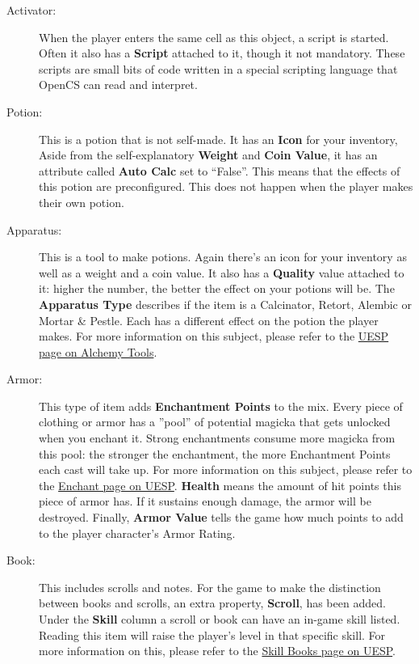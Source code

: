 \begin{description}
 \item[Activator:] When the player enters the same cell as this object, a script is started. Often it also has a \textbf{Script} attached to it, though it not mandatory. These scripts are small bits of code written in a special scripting language that OpenCS can read and interpret.
 \item[Potion:] This is a potion that is not self-made. It has an \textbf{Icon} for your inventory, Aside from the self-explanatory \textbf{Weight} and \textbf{Coin Value}, it has an attribute called \textbf{Auto Calc} set to ``False''. This means that the effects of this potion are preconfigured. This does not happen when the player makes their own potion.
 \item[Apparatus:] This is a tool to make potions. Again there's an icon for your inventory as well as a weight and a coin value. It also has a \textbf{Quality} value attached to it: higher the number, the better the effect on your potions will be. The \textbf{Apparatus Type} describes if the item is a Calcinator, Retort, Alembic or Mortar \& Pestle. Each has a different effect on the potion the player makes. For more information on this subject, please refer to the \href{http://www.uesp.net/wiki/Morrowind:Alchemy#Tools}{UESP page on Alchemy Tools}.
 \item[Armor:] This type of item adds \textbf{Enchantment Points} to the mix. Every piece of clothing or armor has a ''pool'' of potential magicka that gets unlocked when you enchant it. Strong enchantments consume more magicka from this pool: the stronger the enchantment, the more Enchantment Points each cast will take up. For more information on this subject, please refer to the \href{http://www.uesp.net/wiki/Morrowind:Enchant}{Enchant page on UESP}. \textbf{Health} means the amount of hit points this piece of armor has. If it sustains enough damage, the armor will be destroyed. Finally, \textbf{Armor Value} tells the game how much points to add to the player character's Armor Rating.
 \item[Book:] This includes scrolls and notes. For the game to make the distinction between books and scrolls, an extra property, \textbf{Scroll}, has been added. Under the \textbf{Skill} column a scroll or book can have an in-game skill listed. Reading this item will raise the player's level in that specific skill. For more information on this, please refer to the \href{http://www.uesp.net/wiki/Morrowind:Skill_Books}{Skill Books page on UESP}.

\end{description}
